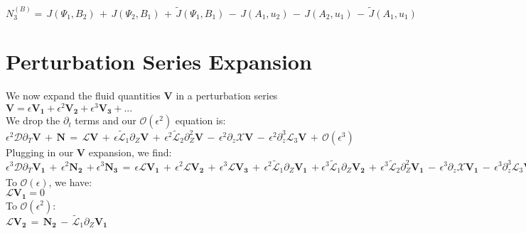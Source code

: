 \documentclass[letterpaper,12pt]{article}
\begin{document}
$N_3^{(B)} = \, J(\Psi_1, B_2) \, + \, J(\Psi_2, B_1) \, + \, \widetilde{J}(\Psi_1, B_1) \, - \, J(A_1, u_2) \, - \,  J(A_2, u_1) \, - \, \widetilde{J}(A_1, u_1) \, $\\

\section*{Perturbation Series Expansion}

We now expand the fluid quantities $\mathbf{V}$ in a perturbation series $\mathbf{V} = \epsilon\mathbf{V_1} + \epsilon^2\mathbf{V_2} + \epsilon^3\mathbf{V_3} + ...$ \\

We drop the $\partial_t$ terms and our $\mathcal{O}(\epsilon^2)$ equation is: \\

$\epsilon^2 \mathcal{D}\partial_T\mathbf{V} \, + \, \mathbf{N} \, = \, \mathcal{L}\mathbf{V} \, + \, \epsilon\widetilde{\mathcal{L}}_1\partial_Z\mathbf{V} \, + \, \epsilon^2\widetilde{\mathcal{L}}_2\partial_Z^2\mathbf{V} \, - \, \epsilon^2\partial_z\mathcal{X}\mathbf{V} \, - \, \epsilon^2\partial_z^3\mathcal{L}_3\mathbf{V} \, + \, \mathcal{O}(\epsilon^3)$ \\

Plugging in our $\mathbf{V}$ expansion, we find: \\

$\epsilon^3 \mathcal{D} \partial_T \mathbf{V_1} \, + \, \epsilon^2\mathbf{N_2} \, + \epsilon^3 \mathbf{N_3} \, = \, \epsilon\mathcal{L}\mathbf{V_1} \, + \, \epsilon^2 \mathcal{L} \mathbf{V_2} \, + \, \epsilon^3 \mathcal{L}\mathbf{V_3} \, + \, \epsilon^2\widetilde{\mathcal{L}}_1 \partial_Z \mathbf{V_1} \, + \epsilon^3 \widetilde{\mathcal{L}}_1\partial_Z \mathbf{V_2} \, + \, \epsilon^3 \widetilde{\mathcal{L}}_2 \partial_Z^2 \mathbf{V_1} \, - \, \epsilon^3\partial_z \mathcal{X} \mathbf{V_1} \, - \, \epsilon^3\partial_z^3\mathcal{L}_3\mathbf{V_1} \, + \, \mathcal{O}(\epsilon^4)$ \\

To $\mathcal{O}(\epsilon)$, we have: \\

$\mathcal{L}\mathbf{V_1} = 0$ \\

To $\mathcal{O}(\epsilon^2)$: \\

$\mathcal{L}\mathbf{V_2} \, = \, \mathbf{N_2} \, - \, \widetilde{\mathcal{L}}_1 \partial_Z \mathbf{V_1}$ \\
\end{document}
